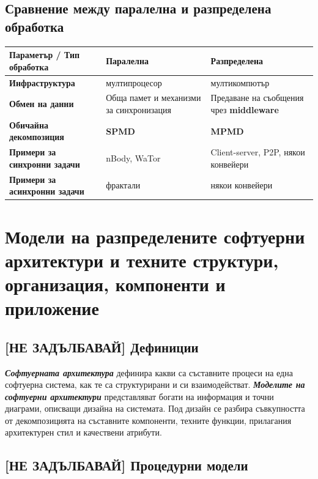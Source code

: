 \documentclass{scrartcl}
\begin{document}
\begin{FlushLeft}
\subsection{Сравнение между паралелна и разпределена обработка}
\begin{center}
    \begin{tabular}{ | m{45mm} | m{45mm}| m{45mm} | } 
    \hline
    \textbf{Параметър / Тип обработка} & \textbf{Паралелна} & \textbf{Разпределена} \\ 
    \hline
    \textbf{Инфраструктура} & мултипроцесор & мултикомпютър \\ 
    \hline
    \textbf{Обмен на данни} & Обща памет и механизми за синхронизация & Предаване на съобщения чрез \textbf{middleware} \\ 
    \hline
    \textbf{Обичайна декомпозиция} & \textbf{SPMD} & \textbf{MPMD} \\ 
    \hline
    \textbf{Примери за синхронни задачи} & nBody, WaTor & Client-server, P2P, някои конвейери \\ 
    \hline
    \textbf{Примери за асинхронни задачи} & фрактали & някои конвейери \\ 
    \hline
    \end{tabular}
\end{center}

\section{Модели на разпределените софтуерни архитектури и техните структури, организация, компоненти и приложение}

\subsection{[НЕ ЗАДЪЛБАВАЙ] Дефиниции}
\textbf{\textit{Софтуерната архитектура}} дефинира какви са съставните процеси на една софтуерна система, как те са структурирани и си взаимодействат.
\textbf{\textit{Моделите на софтуерни архитектури}} представляват богати на информация и точни диаграми, описващи дизайна на системата.
Под дизайн се разбира съвкупността от декомпозицията на съставните компоненти, техните функции, прилагания архитектурен стил и качествени атрибути.

\subsection{[НЕ ЗАДЪЛБАВАЙ] Процедурни модели}


\end{FlushLeft}
\end{document}
